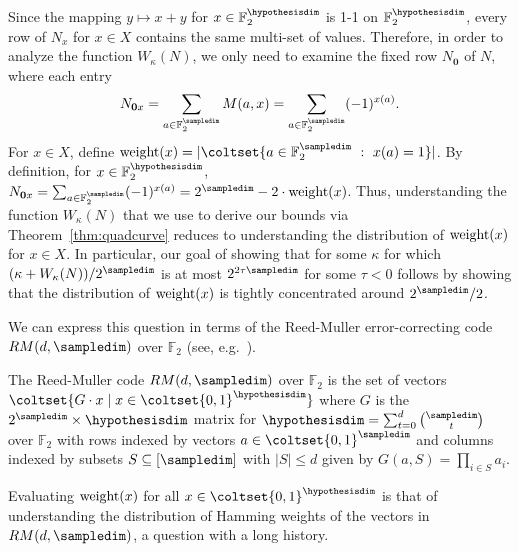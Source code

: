 Since the mapping $y\mapsto x+y$ for $x\in \mathbb{F}_2^\hypothesisdim$ is
1-1 on $\mathbb{F}_2^\hypothesisdim$, 
every row of $N_x$ for $x\in X$ contains the same multi-set of values.
Therefore, in order to analyze the function $W_\kappa(N)$,
we only need to examine the fixed row $N_\mathbf{0}$ of $N$,
where each entry
$$N_{\mathbf{0}x}=\sum_{a\in \mathbb{F}_2^\sampledim} M(a,x)=\sum_{a\in \mathbb{F}_2^\sampledim}(-1)^{x(a)}.$$
For $x\in X$, define $\w(x)=|\coltset{a\in \mathbb{F}_2^\sampledim\ :\ x(a)=1}|$.
By definition, for $x\in \mathbb{F}_2^\hypothesisdim$, 
$N_{\mathbf{0}x}=\sum_{a\in \mathbb{F}_2^\sampledim}(-1)^{x(a)}=2^\sampledim-2\cdot \w(x)$.
Thus, understanding the function $W_\kappa(N)$ that we use to derive our
bounds via Theorem~\ref{thm:quadcurve} reduces to understanding the distribution of
$\textrm{weight}(x)$ for $x\in X$.
In particular, our goal of showing that for some $\kappa$ for which
$(\kappa+W_\kappa(N))/2^\sampledim$ is at most $2^{2\tau \sampledim}$ for some $\tau<0$ 
follows by showing that the distribution of $\textrm{weight}(x)$ is tightly concentrated
around $2^{\sampledim}/2$.

We can express this question in terms of 
the Reed-Muller error-correcting code $RM(d,\sampledim)$ over $\mathbb{F}_2$
(see, e.g.~\cite{berlekamp-book}).

\begin{defn}
The Reed-Muller code $RM(d,\sampledim)$ over $\mathbb{F}_2$ is the set of vectors
$\coltset{G\cdot x\mid x\in \coltset{0,1}^\hypothesisdim}$ where $G$ is the $2^\sampledim\times \hypothesisdim$ matrix
for $\hypothesisdim=\sum_{t=0}^d \binom{\sampledim}{t}$ over $\mathbb{F}_2$
with rows indexed by vectors $a\in \coltset{0,1}^\sampledim$ and columns indexed by
subsets $S\subseteq [\sampledim]$ with $|S|\le d$ given by $G(a,S)=\prod_{i\in S} a_i$.
\end{defn}


Evaluating $\textrm{weight}(x)$ for all $x\in \coltset{0,1}^\hypothesisdim$ is that of
understanding the distribution of Hamming weights of the vectors in $RM(d,\sampledim)$,
a question with a long history.


